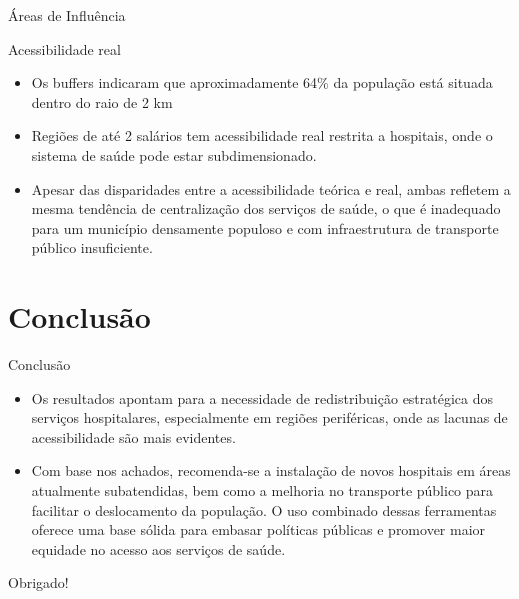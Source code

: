\documentclass{beamer}
\begin{document}
\begin{frame}{Áreas de Influência}
    \begin{block}{Acessibilidade real}
      \begin{itemize}
        \item Os buffers indicaram que aproximadamente 64\% da população está situada dentro do raio de 2 km
        \item Regiões de até 2 salários tem acessibilidade real restrita a hospitais, onde o sistema de saúde pode estar subdimensionado.
        \item Apesar das disparidades entre a acessibilidade teórica e real, ambas refletem a mesma tendência de centralização dos serviços de saúde, o que é inadequado para um município densamente populoso e com infraestrutura de transporte público insuficiente.
      \end{itemize}   
    \end{block}
\end{frame}

\section{Conclusão}
\begin{frame}{Conclusão}
    \begin{itemize}
        \item Os resultados apontam para a necessidade de redistribuição estratégica dos serviços hospitalares, especialmente em regiões periféricas, onde as lacunas de acessibilidade são mais evidentes.
        \item Com base nos achados, recomenda-se a instalação de novos hospitais em áreas atualmente subatendidas, bem como a melhoria no transporte público para facilitar o deslocamento da população. O uso combinado dessas ferramentas oferece uma base sólida para embasar políticas públicas e promover maior equidade no acesso aos serviços de saúde.
    \end{itemize}
\end{frame}

\begin{frame}
    \centering
    \Huge Obrigado!
\end{frame}
\end{document}
